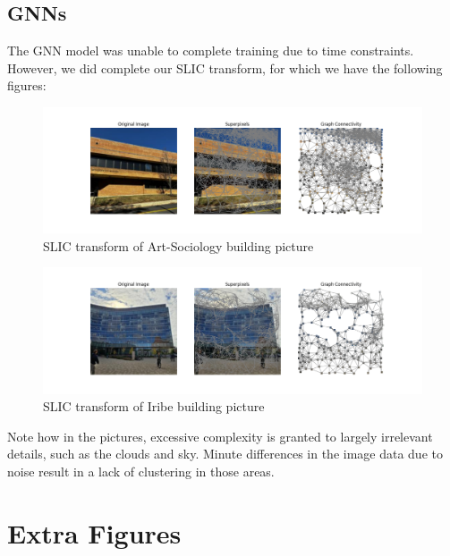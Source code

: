 \documentclass{article}
\begin{document}
\subsection{GNNs}

The GNN model was unable to complete training due to time constraints. However, we did complete our SLIC transform, for which we have the following figures:

\begin{figure}[H]
    \centering
    \includegraphics[width=0.8\linewidth]{slic_1.png}
    \caption{SLIC transform of Art-Sociology building picture}
    \label{fig:slic1}
\end{figure}

\begin{figure}[H]
    \centering
    \includegraphics[width=0.8\linewidth]{slic_2.png}
    \caption{SLIC transform of Iribe building picture}
    \label{fig:slic2}
\end{figure}

Note how in the pictures, excessive complexity is granted to largely irrelevant details, such as the clouds and sky. Minute differences in the image data due to noise result in a lack of clustering in those areas. 

\section{Extra Figures}
\label{extra_figures}
\end{document}
